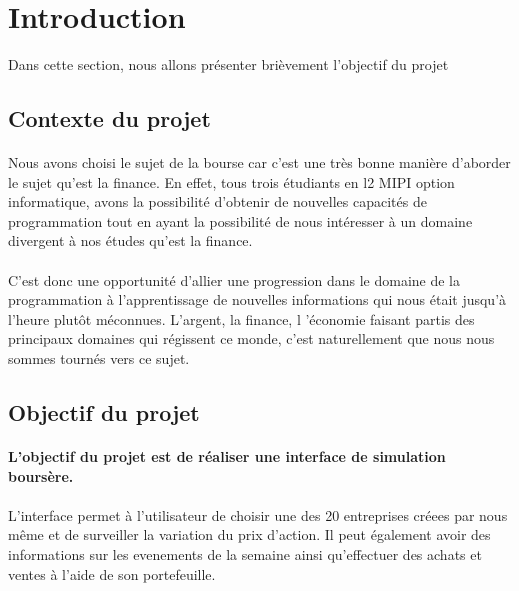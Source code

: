 \newpage
\section{Introduction}
\label{sec:introduction}

Dans cette section, nous allons présenter brièvement l'objectif du projet 


\subsection{Contexte du projet}


\paragraph{}Nous avons choisi le sujet de la
bourse car c'est une très bonne manière d'aborder le sujet qu'est la finance. En effet, tous trois
étudiants en l2 MIPI option informatique, avons la possibilité d'obtenir de nouvelles capacités de
programmation tout en ayant la possibilité de nous intéresser à un domaine divergent à nos études
qu'est la finance.
\paragraph{}C'est donc une opportunité d'allier une progression dans le domaine de la
programmation à l’apprentissage de nouvelles informations qui nous était jusqu'à l'heure plutôt
méconnues. L'argent, la finance, l 'économie faisant partis des principaux domaines qui régissent ce
monde, c'est naturellement que nous nous sommes tournés vers ce sujet.

\subsection{Objectif du projet}
\paragraph{ L'objectif du projet est de réaliser une interface de simulation boursère.}
\paragraph{} L'interface permet à l'utilisateur de choisir une des 20 entreprises créees par nous même et de surveiller la variation du prix d'action. Il peut également avoir des informations sur les evenements de la semaine ainsi qu'effectuer des achats et ventes à l'aide de son portefeuille.
